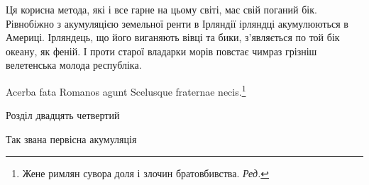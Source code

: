 Ця корисна метода, які і все гарне на цьому світі, має свій
поганий бік. Рівнобіжно з акумуляцією земельної ренти в Ірляндії
ірляндці акумулюються в Америці. Ірляндець, що його виганяють
вівці та бики, з’являється по той бік океану, як феній.
І проти старої владарки морів повстає чимраз грізніш велетенська
молода республіка.

                                      Acerba fata Romanos agunt
                                       Scelusque fraternae necis.\footnote*{
Жене римлян сувора доля і злочин братовбивства. \emph{Ред.}
}

Розділ двадцять четвертий

Так звана первісна акумуляція